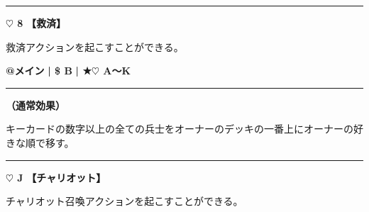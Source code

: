 \documentclass[twocolumn,a5paper,papersize,10pt]{jarticle}
\begin{document}
\vspace{3mm} %
\hrule height 0.5mm depth 0mm width 66.5mm %
\vspace{1mm} %
{\Large\bf $\heartsuit$ 8} {\normalsize\bf【救済】} %
\vspace{1mm} %

救済アクションを起こすことができる。

\begin{tcolorbox}[title={\small\bf【Action】救済}{\scriptsize （通常魔法）}]

{\scriptsize\bf @メイン }
  {\scriptsize\bf | \$ B }
  {\scriptsize\bf | ★{\normalsize $\heartsuit$} A〜K}

\vspace{1mm} %
\hrule height 0.1mm depth 0mm width 62mm %
\vspace{1mm} %

{\bf（通常効果）}

キーカードの数字以上の全ての兵士をオーナーのデッキの一番上にオーナーの好きな順で移す。

\vspace{1mm} %
\end{tcolorbox}

\vspace{-1zh}
  
 

\vspace{3mm} %
\hrule height 0.5mm depth 0mm width 66.5mm %
\vspace{1mm} %
{\Large\bf $\heartsuit$ J} {\normalsize\bf【チャリオット】} %
\vspace{1mm} %

チャリオット召喚アクションを起こすことができる。
\end{document}
